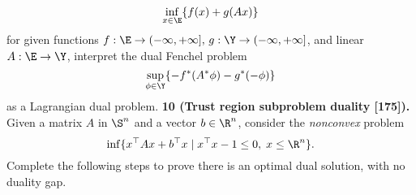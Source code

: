 \documentclass[../borwein-lewis_notes.tex]{subfiles}
\begin{document}
\begin{equation*}
\inf_{x\in\E}\{f(x) + g(Ax)\}
\end{equation*}
for given functions $f:\E\to (-\infty, +\infty],\, g:\Y\to(-\infty, 
+\infty]$, and linear $A:\E\to\Y$, interpret the dual Fenchel problem
\begin{equation*}
\sup_{\phi\in\Y}\{-f^*(A^*\phi)-g^*(-\phi)\}
\end{equation*}
as a Lagrangian dual problem.
\noindent
\textbf{10 (Trust region subproblem duality [175]).} Given a matrix $A$ in 
$\S^n$ and a vector $b\in\R^n$, consider the \textit{nonconvex} problem 
\begin{equation*}
\inf\{x^\top Ax + b^\top x\mid x^\top x-1\leq 0,\;x\leq\R^n\}.
\end{equation*}
Complete the following steps to prove there is an optimal dual solution,
with no duality gap.
\end{document}
